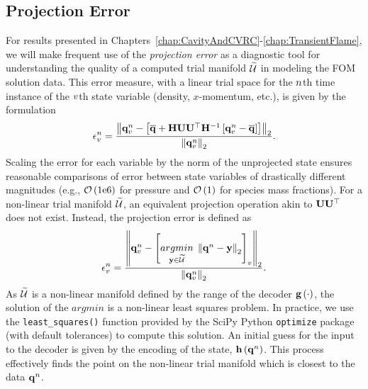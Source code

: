 \subsection{Projection Error}\label{subsec:projError}

For results presented in Chapters~\ref{chap:CavityAndCVRC}-\ref{chap:TransientFlame}, we will make frequent use of the \textit{projection error} as a diagnostic tool for understanding the quality of a computed trial manifold $\trialSpace$ in modeling the FOM solution data. This error measure, with a linear trial space for the $n$th time instance of the $v$th state variable (density, $x$-momentum, etc.), is given by the formulation
%
\begin{equation}\label{eq:projErrLinear}
    \errVecVar^\timeIdx = \frac{\left\Vert \stateVecVar^\timeIdx - \left[\stateVecCent + \scaleMat \basisMat \basisMat^\top \scaleMatInv \left[ \stateVecVar^\timeIdx - \stateVecCent \right] \right] \right\Vert_2}{\left\Vert \stateVecVar^\timeIdx \right\Vert_2}.
\end{equation}
%
Scaling the error for each variable by the norm of the unprojected state ensures reasonable comparisons of error between state variables of drastically different magnitudes (e.g., $\mathcal{O}\left(1\text{e}6\right)$ for pressure and $\mathcal{O}\left(1\right)$ for species mass fractions). For a non-linear trial manifold $\trialSpace$, an equivalent projection operation akin to $\basisMat \basisMat^\top$ does not exist. Instead, the projection error is defined as
%
\begin{equation}\label{eq:projErrNonlin}
    \errVecVar^\timeIdx = \frac{\left\Vert \stateVecVar^\timeIdx - \left[ \argmin{\dummyVec \in \trialSpace} \left\Vert \stateVec^\timeIdx - \dummyVec \right\Vert_2 \right]_{\varIdx} \right\Vert_2}{\left\Vert \stateVecVar^\timeIdx \right\Vert_2}.
\end{equation}
%
As $\trialSpace$ is a non-linear manifold defined by the range of the decoder $\mathbf{g} \left(\cdot\right)$, the solution of the $argmin$ is a non-linear least squares problem. In practice, we use the \verb|least_squares()| function provided by the SciPy Python \texttt{optimize} package (with default tolerances) to compute this solution. An initial guess for the input to the decoder is given by the encoding of the state, $\mathbf{h} \left(\mathbf{q}^{n}\right)$. This process effectively finds the point on the non-linear trial manifold which is closest to the data $\mathbf{q}^{n}$.

